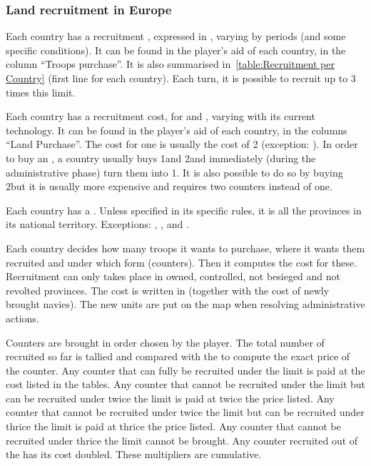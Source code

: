 \subsubsection{Land recruitment in Europe}
\aparag[Limit]
\bparag Each country has a recruitment , expressed in \LD,
varying by periods (and some specific conditions).
\bparag It can be found in the player's aid of each country, in the column
``Troops purchase''.
\bparag It is also summarised in~\ref{table:Recruitment per Country} (first
line for each country).
\bparag Each turn, it is possible to recruit up to 3 times this limit.

\aparag[Costs]
\bparag Each country has a recruitment cost, for \LD and \ARMY\Facemoins,
varying with its current technology.
\bparag It can be found in the player's aid of each country, in the columns
``Land Purchase''.
\bparag The cost for one \ARMY\Facemoins is usually the cost of 2\LD
(exception: \RUS).
\bparag In order to buy an \ARMY\Faceplus, a country usually buys
1\ARMY\Facemoins and 2\LD and immediately (during the administrative phase)
turn them into 1\ARMY\Faceplus. It is also possible to do so by buying
2\ARMY\Facemoins but it is usually more expensive and requires two \ARMY
counters instead of one.

 Each country has a . Unless
specified in its specific rules, it is all the provinces in its national
territory.
\bparag Exceptions: \HIS, \TUR, \RUS and \SUE.

\aparag[Recruitment.] Each country decides how many troops it wants to
purchase, where it wants them recruited and under which form (counters). Then
it computes the cost for these.
\bparag Recruitment can only takes place in owned, controlled, not besieged
and not revolted provinces.
\bparag The cost is written in  (together with the
cost of newly brought navies).
\bparag The new units are put on the map when resolving administrative
actions.

\aparag[Multipliers.] Counters are brought in order chosen by the player. The
total number of \LD recruited so far is tallied and compared with the
 to compute the exact price of the counter.
\bparag Any counter that can fully be recruited under the limit is paid at the
cost listed in the tables.
\bparag Any counter that cannot be recruited under the limit but can be
recruited under twice the limit is paid at twice the price listed.
\bparag Any counter that cannot be recruited under twice the limit but can be
recruited under thrice the limit is paid at thrice the price listed.
\bparag Any counter that cannot be recruited under thrice the limit cannot be
brought.
\bparag Any counter recruited out of the  has its cost
doubled.
\bparag These multipliers are cumulative.

